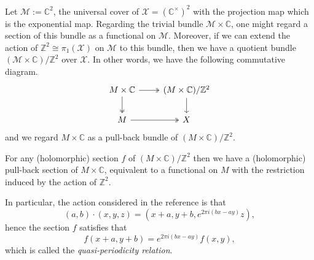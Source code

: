 \documentclass[11pt]{amsart}
\begin{document}
Let $\mathcal{M} := \mathbb{C}^2$, the universal cover of $\mathcal{X} = (\mathbb{C}^{\times})^2$ with the projection map which is the exponential map.
Regarding the trivial bundle $\mathcal{M} \times \mathbb{C}$, one might regard a section of this bundle as a functional on $\mathcal{M}$.
Moreover, if we can extend the action of $\mathbb{Z}^2 \cong \pi_1(\mathcal{X})$ on $\mathcal{M}$ to this bundle, then we have a quotient bundle $(\mathcal{M} \times \mathbb{C})/\mathbb{Z}^2$ over $\mathcal{X}$.
In other words, we have the following commutative diagram.
\[
    \begin{tikzcd}
    M \times \mathbb{C} \arrow[r, two heads] \arrow[d, two heads]
    & (M \times \mathbb{C})/\mathbb{Z}^2 \arrow[d] \\
    M \arrow[r, two heads]
    & X
    \end{tikzcd}
\]
and we regard \( M \times \mathbb{C} \) as a pull-back bundle of \( (M \times \mathbb{C})/\mathbb{Z}^2 \).

For any (holomorphic) section $f$ of \( (M \times \mathbb{C})/\mathbb{Z}^2 \) then we have a (holomorphic) pull-back section of $M \times \mathbb{C}$, equivalent to a functional on $M$ with the restriction induced by the action of $\mathbb{Z}^2$.

In particular, the action considered in the reference is that
\[
    (a,b) \cdot (x, y, z) = (x+a, y+b, e^{2\pi i(bx - ay)} z),
\]
hence the section $f$ satisfies that 
\[
    f(x+a, y+b) = e^{2\pi i(bx - ay)} f(x,y),
\]
which is called the \emph{quasi-periodicity relation}.





\end{document}
